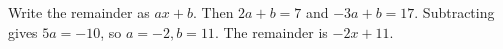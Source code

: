 Write the remainder as $ax+b$. Then $2a+b=7$ and $-3a+b=17$. Subtracting gives $5a=-10$, so $a=-2,b=11$. The remainder is $\boxed{-2x+11}$.

